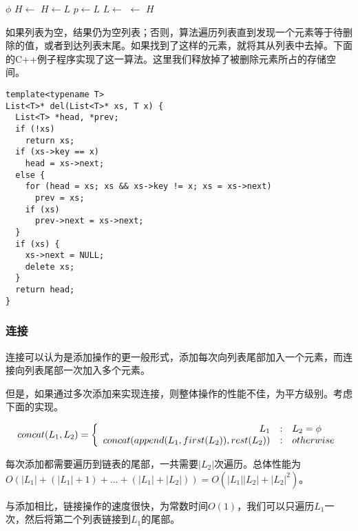 \documentclass[UTF8]{article}
\begin{document}
\begin{algorithmic}[1]
   
    \State \Return $\phi$
  \EndIf
    \State $H \gets$ 
  \Else
    \State $H \gets L$
     
      \State $p \gets L$
      \State $L \gets$ 
    \EndWhile
     
      \State {} $\gets$ 
    \EndIf
  \EndIf
  \State \Return $H$
\EndFunction
\end{algorithmic}

如果列表为空，结果仍为空列表；否则，算法遍历列表直到发现一个元素等于待删除的值，或者到达列表末尾。如果找到了这样的元素，就将其从列表中去掉。下面的C++例子程序实现了这一算法。这里我们释放掉了被删除元素所占的存储空间。

\lstset{language=C++}
\begin{lstlisting}
template<typename T>
List<T>* del(List<T>* xs, T x) {
  List<T> *head, *prev;
  if (!xs)
    return xs;
  if (xs->key == x)
    head = xs->next;
  else {
    for (head = xs; xs && xs->key != x; xs = xs->next)
      prev = xs;
    if (xs)
      prev->next = xs->next;
  }
  if (xs) {
    xs->next = NULL;
    delete xs;
  }
  return head;
}
\end{lstlisting}

\subsubsection{连接}
\label{concat}

连接可以认为是添加操作的更一般形式，添加每次向列表尾部加入一个元素，而连接向列表尾部一次加入多个元素。

但是，如果通过多次添加来实现连接，则整体操作的性能不佳，为平方级别。考虑下面的实现。

\[
concat(L_1, L_2) = \left \{
  \begin{array}
  {r@{\quad:\quad}l}
  L_1 & L_2 = \phi \\
  concat(append(L_1, first(L_2)), rest(L_2)) & otherwise
  \end{array}
\right.
\]

每次添加都需要遍历到链表的尾部，一共需要$|L_2|$次遍历。总体性能为$O(|L_1| + (|L_1| + 1) + ... + (|L_1| + |L_2|)) = O(|L_1||L_2| + |L_2|^2)$。

与添加相比，链接操作的速度很快，为常数时间$O(1)$，我们可以只遍历$L_1$一次，然后将第二个列表链接到$L_1$的尾部。
\end{document}
